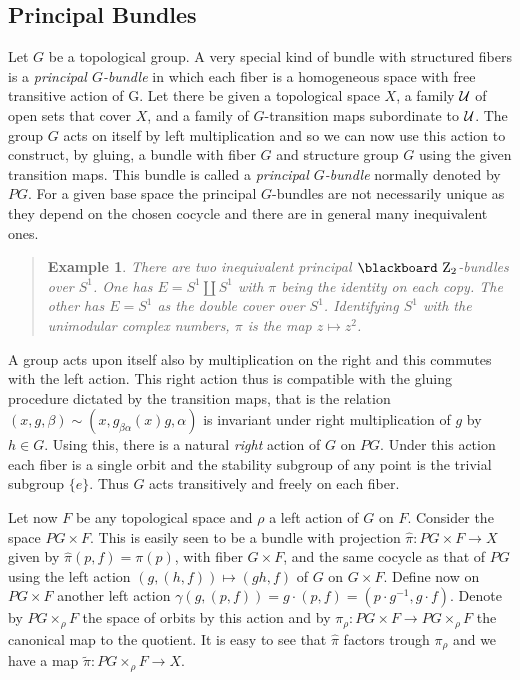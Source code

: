 \documentclass[12pt,titlepage]{article}
\def\bbf#1{\hbox{\blackboard #1}}
\def\lZ{\bbf Z}
\def\cU{{\cal U}}
\newtheorem{eg}{Example}
\newenvironment{example}{\begin{quote}\begin{eg}}{\end{eg}\end{quote}}
\begin{document}
\subsection{Principal Bundles}
Let \(G\) be a topological group. 
A very special kind of bundle with structured
fibers is a {\em principal
\(G\)-bundle\/}
%
 in which each fiber is a homogeneous space with free
transitive action of G.
Let there be given a topological space   \(X\), a family \(\cU\) of  
open sets
that cover
\(X\), and  a family of \(G\)-transition maps
subordinate to
\(\cU\).  The group \(G\) acts on itself by left
multiplication and so we can now use this action to construct, by gluing, 
a
bundle with fiber \(G\) and structure group \(G\) using the given
transition maps. This bundle is called a {\em principal \(G\)-bundle\/}
normally denoted by \(PG\).
%
  For a given base space the principal
\(G\)-bundles are not necessarily unique as they depend on the chosen
cocycle and there are in general many inequivalent ones.


\begin{example} \label{ex:pz2}  There are two
inequivalent principal \(\lZ_2\)-bundles over \(S^1\). One has
\(E=S^1\coprod S^1\) with \(\pi\) being the identity on each copy.
The other has \(E=S^1\) as the double cover over \(S^1\). 
Identifying \(S^1 \) with the unimodular complex numbers, 
\(\pi\) is the map \(z\mapsto z^2\).
\end{example}%


A group acts upon itself also by multiplication on the right and this
commutes with the left action. This right action thus is compatible with
the gluing procedure dictated by the transition maps, that is the relation
\((x,g,\beta) \sim (x,g_{\beta\alpha}(x)g,\alpha)\) is invariant
under right multiplication of \(g\) by \linebreak \(h\in G\).
Using this, there is a natural {\em right\/} action of \(G\) on \(PG\).
Under this action each fiber is a single orbit and the stability
subgroup of any point is the trivial subgroup \(\{e\}\).  Thus \(G\)
acts transitively and freely on each fiber. 

Let now \(F\) be any topological space and \(\rho\) a left action of
\(G\) on \(F\). Consider the space \(PG \times F\). This is easily seen
to be a bundle with projection \linebreak
\(\hat\pi:PG\times F \to X\) given by
\(\hat\pi(p,f) = \pi(p)\), with fiber \(G\times F\), and the same cocycle
as that of
\(PG\) using the left action \((g,(h,f))\mapsto (gh, f)\) of \(G\) on
\(G\times F\). Define now on \(PG \times F\) another left action
\(\gamma(g, (p,f)) =g\cdot(p,f) =(p\cdot g^{-1},g\cdot f)\). 
Denote by \(PG \times_\rho F\)
% 
the space of orbits by this action and by \(\pi_\rho: PG \times F \to
PG \times_\rho F\) the canonical map to the quotient. It is easy to see
that \(\hat\pi\) factors trough \(\pi_\rho\) and we have a map
\(\tilde\pi:PG \times_\rho F\to X\).
\end{document}
